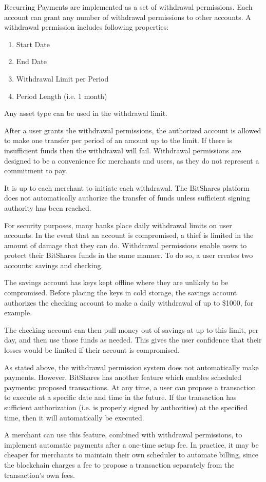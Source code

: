 
Recurring Payments are implemented as a set of withdrawal permissions. Each
account can grant any number of withdrawal permissions to other accounts. A
withdrawal permission includes following properties:
\begin{enumerate}
 \item Start Date
 \item End Date
 \item Withdrawal Limit per Period
 \item Period Length (i.e. 1 month)
\end{enumerate}

Any asset type can be used in the withdrawal limit.

After a user grants the withdrawal permissions, the authorized account is
allowed to make one transfer per period of an amount up to the limit. If
there is insufficient funds then the withdrawal will fail. Withdrawal
permissions are designed to be a convenience for merchants and users, as they
do not represent a commitment to pay.

It is up to each merchant to initiate each withdrawal. The BitShares platform
does not automatically authorize the transfer of funds unless sufficient
signing authority has been reached.


For security purposes, many banks place daily withdrawal limits on user
accounts. In the event that an account is compromised, a thief is limited in
the amount of damage that they can do. Withdrawal permissions enable users
to protect their BitShares funds in the same manner. To do so, a user creates
two accounts: savings and checking.

The savings account has keys kept offline where they are unlikely to be
compromised. Before placing the keys in cold storage, the savings account
authorizes the checking account to make a daily withdrawal of up to \$1000, for
example.

The checking account can then pull money out of savings at up to this limit,
per day, and then use those funds as needed. This gives the user confidence
that their losses would be limited if their account is compromised.


As stated above, the withdrawal permission system does not automatically make
payments. However, BitShares has another feature which enables scheduled
payments: proposed transactions. At any time, a user can propose a transaction
to execute at a specific date and time in the future. If the transaction has
sufficient authorization (i.e. is properly signed by authorities) at the
specified time, then it will automatically be executed.

A merchant can use this feature, combined with withdrawal permissions, to
implement automatic payments after a one-time setup fee. In practice, it may
be cheaper for merchants to maintain their own scheduler to automate billing,
since the blockchain charges a fee to propose a transaction separately from the
transaction's own fees.
